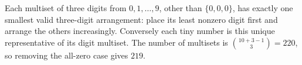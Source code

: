 Each multiset of three digits from $0,1,\ldots,9$, other than $\{0,0,0\}$, has exactly one smallest valid three-digit arrangement: place its least nonzero digit first and arrange the others increasingly. Conversely each tiny number is this unique representative of its digit multiset. The number of multisets is $\binom{10+3-1}{3}=220$, so removing the all-zero case gives $\boxed{219}$.
